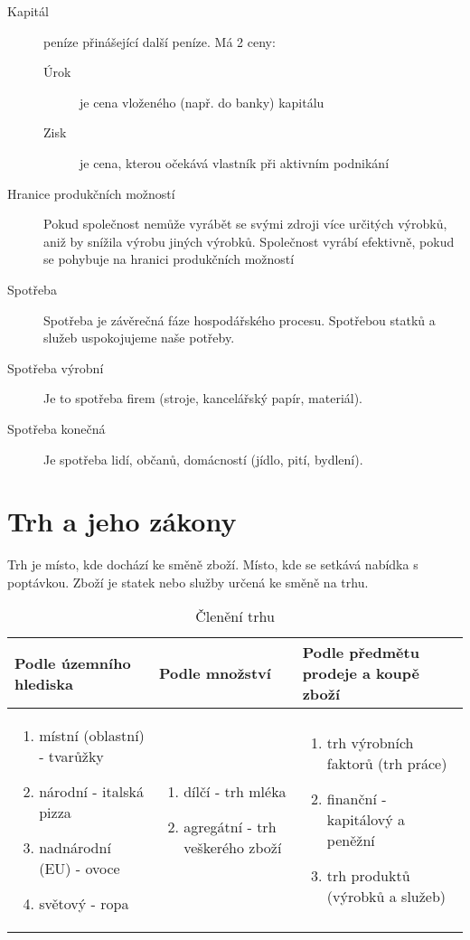 \documentclass[11pt,a4paper,twoside]{book}
\begin{document}
\begin{description}
		\item[Kapitál] peníze přinášející další peníze. Má 2 ceny:
		\begin{description}
			\item[Úrok] je cena vloženého (např. do banky) kapitálu
			\item[Zisk] je cena, kterou očekává vlastník při aktivním podnikání
		\end{description}
		\item[Hranice produkčních možností] Pokud společnost nemůže vyrábět se svými zdroji více určitých výrobků, aniž by snížila výrobu jiných výrobků. Společnost vyrábí efektivně, pokud se pohybuje na hranici produkčních možností
		\item[Spotřeba] Spotřeba je závěrečná fáze hospodářského procesu. Spotřebou statků a služeb uspokojujeme naše potřeby.
		\item[Spotřeba výrobní] Je to spotřeba firem (stroje, kancelářský papír, materiál).
		\item[Spotřeba konečná] Je spotřeba lidí, občanů, domácností (jídlo, pití, bydlení).
	\end{description}

	\chapter{Trh a jeho zákony}
	
	Trh je místo, kde dochází ke směně zboží. Místo, kde se setkává nabídka s poptávkou.
	Zboží je statek nebo služby určená ke směně na trhu.
	
	\begin{table}[h]
		\centering
		\caption{Členění trhu}
		\begin{tabular}{| p{5cm} | p{5cm} | p{5cm} |}
			\hline
			Podle územního hlediska &
			Podle množství &
			Podle předmětu prodeje a koupě zboží \\
			\hline
			\begin{enumerate}[label=(\alph*)]
				\item místní (oblastní) - tvarůžky
				\item národní - italská pizza 
				\item nadnárodní (EU) - ovoce 
				\item světový - ropa
			\end{enumerate} &
			\begin{enumerate}[label=(\alph*)]
				\item dílčí - trh mléka
				\item agregátní - trh veškerého zboží
			\end{enumerate} &
			\begin{enumerate}[label=(\alph*)]
				\item trh výrobních faktorů (trh práce)
				\item finanční - kapitálový a peněžní
				\item trh produktů (výrobků a služeb)
			\end{enumerate} \\
			\hline
		\end{tabular}
	\end{table}
	
\end{document}
